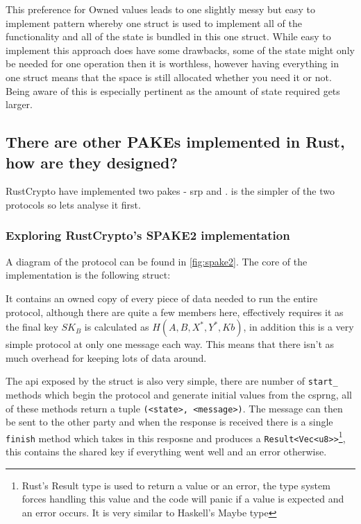 This preference for Owned values leads to one slightly messy but easy to implement pattern whereby one struct is used to implement all of the functionality and all of the state is bundled in this one struct.
While easy to implement this approach does have some drawbacks, some of the state might only be needed for one operation then it is worthless, however having everything in one struct means that the space is still allocated whether you need it or not.
Being aware of this is especially pertinent as the amount of state required gets larger.

\subsection{There are other PAKEs implemented in Rust, how are they designed?}
RustCrypto have implemented two \glspl{pake} - \gls{srp} and .
 is the simpler of the two protocols so lets analyse it first.

\subsubsection{Exploring RustCrypto's SPAKE2 implementation}
A diagram of the  protocol can be found in \cref{fig:spake2}.
The core of the implementation is the following struct:

It contains an owned copy of every piece of data needed to run the entire protocol, although there are quite a few members here,  effectively requires it as the final key $SK_B$ is calculated as $H(A, B, X^*, Y^*, Kb)$, in addition this is a very simple protocol at only one message each way.
This means that there isn't as much overhead for keeping lots of data around.

The \gls{api} exposed by the struct is also very simple, there are number of \texttt{start\_} methods which begin the protocol and generate initial values from the \gls{csprng}, all of these methods return a tuple \texttt{(<state>, <message>)}.
The message can then be sent to the other party and when the response is received there is a single \texttt{finish} method which takes in this resposne and produces a \texttt{Result<Vec<u8>>}\footnote{Rust's Result type is used to return a value or an error, the type system forces handling this value and the code will panic if a value is expected and an error occurs. It is very similar to Haskell's Maybe type}, this contains the shared key if everything went well and an error otherwise.

